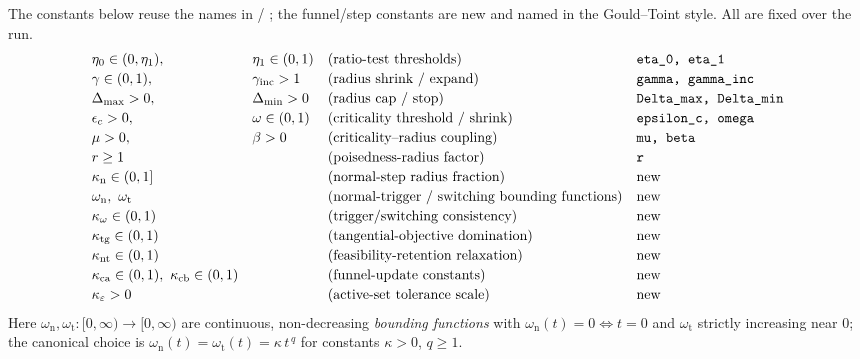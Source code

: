 The constants below reuse the names in  /
; the funnel/step constants are new and named in the
Gould--Toint style. All are fixed over the run.
\[
\begin{array}{llll}
  \eta_0\in(0,\eta_1), & \eta_1\in(0,1) & \text{(ratio-test thresholds)} & \text{\ttfamily eta\_0, eta\_1}\\[2pt]
  \gamma\in(0,1), & \gamma_{\text{inc}}>1 & \text{(radius shrink / expand)} & \text{\ttfamily gamma, gamma\_inc}\\[2pt]
  \Delta_{\max}>0, & \Delta_{\min}>0 & \text{(radius cap / stop)} & \text{\ttfamily Delta\_max, Delta\_min}\\[2pt]
  \epsilon_c>0, & \omega\in(0,1) & \text{(criticality threshold / shrink)} & \text{\ttfamily epsilon\_c, omega}\\[2pt]
  \mu>0, & \beta>0 & \text{(criticality--radius coupling)} & \text{\ttfamily mu, beta}\\[2pt]
  r\ge1 & & \text{(poisedness-radius factor)} & \text{\ttfamily r}\\[2pt]
  \kappa_{\mathrm n}\in(0,1] & & \text{(normal-step radius fraction)} & \text{new}\\[2pt]
  \omega_{\mathrm n},\ \omega_{\mathrm t} & & \text{(normal-trigger / switching bounding functions)} & \text{new}\\[2pt]
  \kappa_\omega\in(0,1) & & \text{(trigger/switching consistency)} & \text{new}\\[2pt]
  \kappa_{\mathrm{tg}}\in(0,1) & & \text{(tangential-objective domination)} & \text{new}\\[2pt]
  \kappa_{\mathrm{nt}}\in(0,1) & & \text{(feasibility-retention relaxation)} & \text{new}\\[2pt]
  \kappa_{\mathrm{ca}}\in(0,1),\ \kappa_{\mathrm{cb}}\in(0,1) & & \text{(funnel-update constants)} & \text{new}\\[2pt]
  \kappa_{\varepsilon}>0 & & \text{(active-set tolerance scale)} & \text{new}
\end{array}
\]
Here $\omega_{\mathrm n},\omega_{\mathrm t}:[0,\infty)\to[0,\infty)$ are continuous,
non-decreasing \emph{bounding functions} with $\omega_{\mathrm n}(t)=0\iff t=0$ and
$\omega_{\mathrm t}$ strictly increasing near $0$; the canonical choice is
$\omega_{\mathrm n}(t)=\omega_{\mathrm t}(t)=\kappa\,t^{\,q}$ for constants
$\kappa>0$, $q\ge1$.

